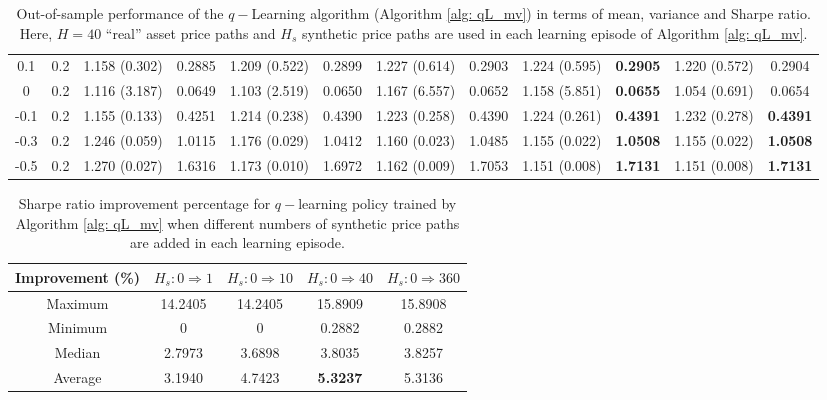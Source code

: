 \documentclass[11pt]{article}
\newcommand{\tbf}{\textbf}
\begin{document}
\begin{table}
\begin{tabular}{c c|| c c | c c | c c | c c | c c}
        0.1 & 0.2
        & 1.158 (0.302) & 0.2885 & 1.209 (0.522) & 0.2899 & 1.227 (0.614) & 0.2903 & 1.224 (0.595) & \tbf{0.2905} & 1.220 (0.572) & 0.2904
        \\

        0 & 0.2
        & 1.116 (3.187) & 0.0649 & 1.103 (2.519) & 0.0650 & 1.167 (6.557) & 0.0652 & 1.158 (5.851) & \tbf{0.0655} & 1.054 (0.691) & 0.0654
        \\

        -0.1 & 0.2
        & 1.155 (0.133) & 0.4251 & 1.214 (0.238) & 0.4390 & 1.223 (0.258) & 0.4390 & 1.224 (0.261) & \tbf{0.4391} & 1.232 (0.278) & \textbf{0.4391}
        \\

        -0.3 & 0.2
        & 1.246 (0.059) & 1.0115 & 1.176 (0.029) & 1.0412 & 1.160 (0.023) & 1.0485 & 1.155 (0.022) & \tbf{1.0508} & 1.155 (0.022) & \tbf{1.0508}
        \\

        -0.5 & 0.2 
        & 1.270 (0.027) & 1.6316 & 1.173 (0.010) & 1.6972 & 1.162 (0.009) & 1.7053 & 1.151 (0.008) & \tbf{1.7131} & 1.151 (0.008) & \tbf{1.7131}
        \\
        \bottomrule

    \end{tabular}
    \addtolength{\tabcolsep}{1pt}
    \caption{Out-of-sample performance of the $q-$Learning algorithm (Algorithm \ref{alg: qL_mv}) in terms of mean, variance and Sharpe ratio. Here, $H=40$ ``real'' asset price paths and $H_s$ synthetic price paths are used in each learning episode of Algorithm \ref{alg: qL_mv}.}
    \label{table: qL_mv_simulation_more}
\end{table}





\begin{table}[htp]
    \centering
    \begin{tabular}{c || c | c | c | c}
        \toprule
        Improvement (\%) & $H_s: 0 \Rightarrow  1$ & $H_s : 0 \Rightarrow 10$ & $H_s: 0 \Rightarrow 40$ & $H_s : 0 \Rightarrow  360$\\\hline
        Maximum & 14.2405 & 14.2405 & 15.8909 & 15.8908\\
        Minimum & 0 & 0 & 0.2882 & 0.2882\\
        Median & 2.7973 & 3.6898 & 3.8035 & 3.8257 \\
        Average & 3.1940 & 4.7423 & \tbf{5.3237} & 5.3136\\
        \bottomrule
    \end{tabular}
    \caption{Sharpe ratio improvement percentage for $q-$learning policy trained by Algorithm \ref{alg: qL_mv} when different numbers of synthetic price paths are added in each learning episode.}
    \label{table: qL_mv_simulation_improvement}
\end{table}
\end{document}
